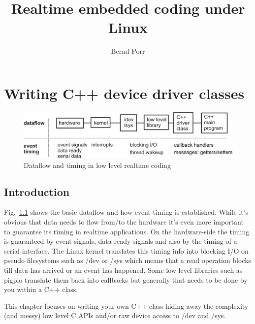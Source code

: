 \documentclass[12pt]{report}
\author{Bernd Porr}
\title{Realtime embedded coding under Linux}
\begin{document}
\maketitle

\tableofcontents

\chapter{Writing C++ device driver classes}

\begin{figure}[!hbt]
\begin{center}
\mbox{\includegraphics[width=\textwidth]{signals-timings}}
\end{center}
\caption{Dataflow and timing in low level realtime coding
\label{timing}}
\end{figure}

\section{Introduction}
Fig.~\ref{timing} shows the basic dataflow and how event timing is
established. While it's obvious that data needs to flow from/to the
hardware it's even more important to guarantee its timing in realtime
applications. On the hardware-side the timing is guaranteed by event
signals, data-ready signals and also by the timing of a serial
interface. The Linux kernel translates this timing info into blocking
I/O on pseudo filesystems such as /dev or /sys which means that a read
operation blocks till data has arrived or an event has happened. Some
low level libraries such as pigpio translate them back into callbacks
but generally that needs to be done by you within a C++ class.

This chapter focuses on writing your own C++ class hiding away
the complexity (and messy) low level C APIs and/or raw device
access to /dev and /sys.
\end{document}
